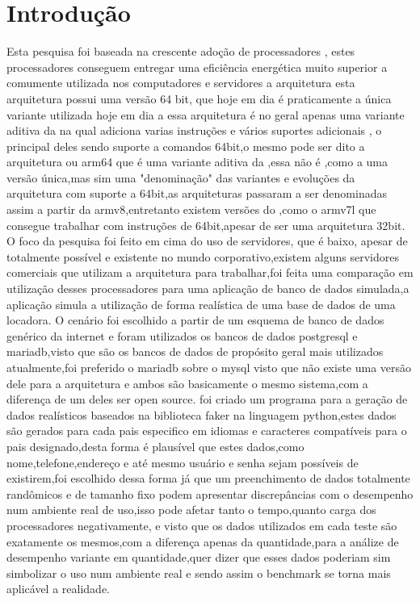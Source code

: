 \documentclass[
	12pt,				%
	openright,			%
	oneside,			%
	a4paper,			%
	english,			%
	french,				%
	spanish,			%
	brazil,				%
	]{abntex2}
\begin{document}
\chapter*{Introdução}
\label{chapter:introducao}
Esta pesquisa foi baseada na crescente adoção de processadores , estes processadores conseguem entregar uma eficiência energética muito superior a comumente utilizada nos computadores e servidores a arquitetura  esta arquitetura possui uma versão 64 bit, que hoje em dia é praticamente a única variante utilizada hoje em dia a  essa arquitetura é no geral apenas uma variante aditiva da  na qual adiciona varias instruções e vários suportes adicionais , o principal deles sendo suporte a comandos 64bit,o mesmo pode ser dito a arquitetura  ou arm64 que é uma variante aditiva da ,essa não é ,como a  uma versão única,mas sim uma "denominação" das variantes e evoluções da arquitetura  com suporte a 64bit,as arquiteturas passaram a ser denominadas assim a partir da armv8,entretanto existem versões do ,como o armv7l que consegue trabalhar com instruções de 64bit,apesar de ser uma arquitetura 32bit.\newline
O foco da pesquisa foi feito em cima do uso de servidores, que é baixo, apesar de totalmente possível e existente no mundo corporativo,existem alguns servidores comerciais que utilizam a arquitetura  para trabalhar,foi feita uma comparação em utilização desses processadores para uma aplicação de banco de dados simulada,a aplicação simula a utilização de forma realística de uma base de dados de uma locadora. \newline
O cenário foi escolhido a partir de um esquema de banco de dados genérico da internet e foram utilizados os bancos de dados postgresql e mariadb,visto que são os bancos de dados de propósito geral mais utilizados atualmente,foi preferido o mariadb sobre o mysql visto que não existe uma versão dele para a arquitetura  e ambos são basicamente o mesmo sistema,com a diferença de um deles ser open source.\newline
foi criado um programa para a geração de dados realísticos baseados na biblioteca faker na linguagem python,estes dados são gerados para cada pais especifico em idiomas e caracteres compatíveis para o pais designado,desta forma é plausível que estes dados,como nome,telefone,endereço e até mesmo usuário e senha sejam possíveis de existirem,foi escolhido dessa forma já que um preenchimento de dados totalmente randômicos e de tamanho fixo podem apresentar discrepâncias com o desempenho num ambiente real de uso,isso pode afetar tanto o tempo,quanto carga dos processadores negativamente, e visto que os dados utilizados em cada teste são exatamente os mesmos,com a diferença apenas da quantidade,para a análize de desempenho variante em quantidade,quer dizer que esses dados poderiam sim simbolizar o uso num ambiente real e sendo assim o benchmark se torna mais aplicável a realidade.\newline
\end{document}
